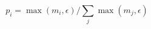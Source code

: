 \par\needspace{70pt}\begin{minipage}{\linewidth}
\begin{equation}p_i=\max(m_i,\epsilon)/\sum_j\max(m_j,\epsilon)\label{eq:12}\end{equation}
\end{minipage}\par
